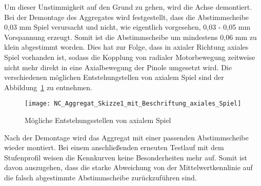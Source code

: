 Um dieser Unstimmigkeit auf den Grund zu gehen, wird die Achse demontiert. Bei der Demontage des Aggregates wird festgestellt, dass die Abstimmscheibe 0,03 mm Spiel verursacht und nicht, wie eigentlich vorgesehen, 0,03 - 0,05 mm Vorspannung erzeugt. Somit ist die Abstimmscheibe um mindestens 0,06 mm zu klein abgestimmt worden. Dies hat zur Folge, dass in axialer Richtung axiales Spiel vorhanden ist, sodass die Kopplung von radialer Motorbewegung zeitweise nicht mehr direkt in eine Axialbewegung der Pinole umgesetzt wird. Die verschiedenen möglichen Entstehungstellen von axialem Spiel sind der Abbildung~\ref{fig:Entstehungstellen von Axialem Spiel} zu entnehmen.


\begin{figure}[H]
\centering
\texttt{[image: NC\_Aggregat\_Skizze1\_mit\_Beschriftung\_axiales\_Spiel]}
\caption{Mögliche Entstehungsstellen von axialem Spiel}
\label{fig:Entstehungstellen von Axialem Spiel}
\end{figure}









Nach der Demontage wird das Aggregat mit einer passenden Abstimmscheibe wieder montiert. Bei einem anschließenden erneuten Testlauf mit dem Stufenprofil weisen die Kennkurven keine Besonderheiten mehr auf. Somit ist davon auszugehen, dass die starke Abweichung von der Mittelwertkennlinie auf die falsch abgestimmte Abstimmscheibe zurückzuführen sind.

